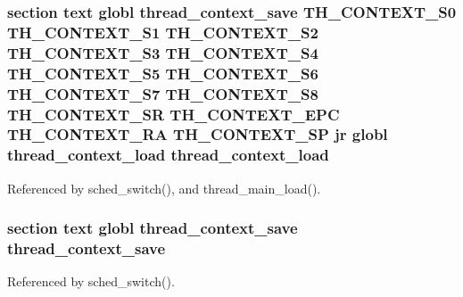 \hypertarget{mips_2threada_8S_a398387f3c20a09104dea669ec8dfdab6}{
\subsubsection[{thread\-\_\-context\-\_\-load}]{\setlength{\rightskip}{0pt plus 5cm}section text globl {\bf thread\-\_\-context\-\_\-save} {\bf T\-H\-\_\-\-C\-O\-N\-T\-E\-X\-T\-\_\-\-S0} {\bf T\-H\-\_\-\-C\-O\-N\-T\-E\-X\-T\-\_\-\-S1} {\bf T\-H\-\_\-\-C\-O\-N\-T\-E\-X\-T\-\_\-\-S2} {\bf T\-H\-\_\-\-C\-O\-N\-T\-E\-X\-T\-\_\-\-S3} {\bf T\-H\-\_\-\-C\-O\-N\-T\-E\-X\-T\-\_\-\-S4} {\bf T\-H\-\_\-\-C\-O\-N\-T\-E\-X\-T\-\_\-\-S5} {\bf T\-H\-\_\-\-C\-O\-N\-T\-E\-X\-T\-\_\-\-S6} {\bf T\-H\-\_\-\-C\-O\-N\-T\-E\-X\-T\-\_\-\-S7} {\bf T\-H\-\_\-\-C\-O\-N\-T\-E\-X\-T\-\_\-\-S8} {\bf T\-H\-\_\-\-C\-O\-N\-T\-E\-X\-T\-\_\-\-S\-R} {\bf T\-H\-\_\-\-C\-O\-N\-T\-E\-X\-T\-\_\-\-E\-P\-C} {\bf T\-H\-\_\-\-C\-O\-N\-T\-E\-X\-T\-\_\-\-R\-A} {\bf T\-H\-\_\-\-C\-O\-N\-T\-E\-X\-T\-\_\-\-S\-P} jr globl thread\-\_\-context\-\_\-load thread\-\_\-context\-\_\-load}}\label{mips_2threada_8S_a398387f3c20a09104dea669ec8dfdab6}


Referenced by sched\-\_\-switch(), and thread\-\_\-main\-\_\-load().

\hypertarget{mips_2threada_8S_a89372006bcc54436099a65419c7895d7}{
\subsubsection[{thread\-\_\-context\-\_\-save}]{\setlength{\rightskip}{0pt plus 5cm}section text globl thread\-\_\-context\-\_\-save thread\-\_\-context\-\_\-save}}\label{mips_2threada_8S_a89372006bcc54436099a65419c7895d7}


Referenced by sched\-\_\-switch().

